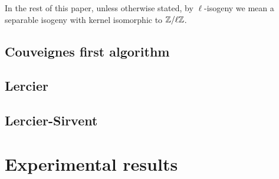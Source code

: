In the rest of this paper, unless otherwise stated, by $\ell$-isogeny
we mean a separable isogeny with kernel isomorphic to $\mathbb{Z}/\ell\mathbb{Z}$.

\section{Couveignes first algorithm}
\section{Lercier}
\section{Lercier-Sirvent}






\chapter{Experimental results}




%

